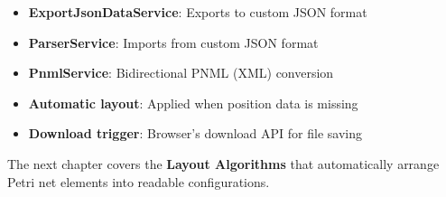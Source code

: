 \begin{itemize}
    \item \textbf{ExportJsonDataService}: Exports to custom JSON format
    \item \textbf{ParserService}: Imports from custom JSON format
    \item \textbf{PnmlService}: Bidirectional PNML (XML) conversion
    \item \textbf{Automatic layout}: Applied when position data is missing
    \item \textbf{Download trigger}: Browser's download API for file saving
\end{itemize}

The next chapter covers the \textbf{Layout Algorithms} that automatically arrange Petri net elements into readable configurations.
